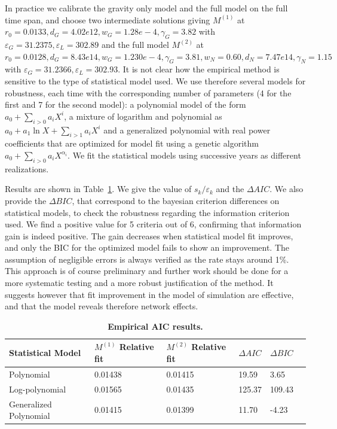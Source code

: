 \documentclass{article}
\begin{document}
In practice we calibrate the gravity only model and the full model on the full time span, and choose two intermediate solutions giving $M^{(1)}$ at $r_0=0.0133, d_G = 4.02e12, w_G = 1.28e-4, \gamma_G = 3.82$ with $\varepsilon_G=31.2375,\varepsilon_L=302.89$ and the full model $M^{(2)}$ at $r_0=0.0128, d_G = 8.43e14, w_G = 1.230e-4, \gamma_G = 3.81, w_N=0.60, d_N=7.47e14, \gamma_N = 1.15$ with $\varepsilon_G=31.2366,\varepsilon_L=302.93$. It is not clear how the empirical method is sensitive to the type of statistical model used. We use therefore several models for robustness, each time with the corresponding number of parameters (4 for the first and 7 for the second model): a polynomial model of the form $a_0 + \sum_{i>0} a_i X^i$, a mixture of logarithm and polynomial as $a_0 + a_1 \ln X + \sum_{i>1} a_i X^i$ and a generalized polynomial with real power coefficients that are optimized for model fit using a genetic algorithm $a_0 + \sum_{i>0} a_i X^{\alpha_i}$. We fit the statistical models using successive years as different realizations.

Results  are shown in Table~\ref{tab:empiricalaic}. We give the value of $s_k / \varepsilon_k$ and the $\Delta AIC$. We also provide the $\Delta BIC$, that correspond to the bayesian criterion differences on statistical models, to check the robustness regarding the information criterion used. We find a positive value for 5 criteria out of 6, confirming that information gain is indeed positive. The gain decreases when statistical model fit improves, and only the BIC for the optimized model fails to show an improvement. The assumption of negligible errors is always verified as the rate stays around 1\%. This approach is of course preliminary and further work should be done for a more systematic testing and a more robust justification of the method. It suggests however that fit improvement in the model of simulation are effective, and that the model reveals therefore network effects.


\begin{table}[ht]
\small\sf\centering
\caption{\textbf{Empirical AIC results.}}\label{tab:empiricalaic}
\begin{tabular}{|l|l|l|l|l|l}
\hline
Statistical Model & $M^{(1)}$ Relative fit & $M^{(2)}$ Relative fit & $\Delta AIC$ & $\Delta BIC$\\
\hline
Polynomial & 0.01438 & 0.01415 & 19.59 & 3.65\\
Log-polynomial & 0.01565  & 0.01435 & 125.37 & 109.43\\
Generalized Polynomial & 0.01415  & 0.01399 & 11.70 & -4.23\\
\hline
\end{tabular}
\end{table}
\end{document}

